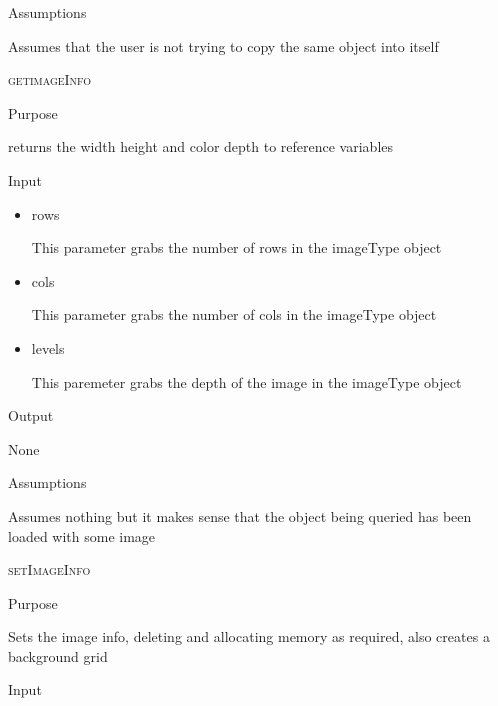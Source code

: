 \documentclass[pdftex, 11pt]{article}
\begin{document}
\begin{description}
\begin{description}
			\item{Assumptions}

				Assumes that the user is not trying to copy the same
				object into itself


		\end{description}


	\item{\textsc{getimageInfo}}
		\begin{description}
			\item{Purpose}
			
 				returns the width height and color depth 
				to reference variables

			\item{Input}

				\begin{itemize}
					\item{rows}

						This parameter grabs the number of rows
						in the imageType object

					\item{cols}

						This parameter grabs the number of cols
						in the imageType object

					\item{levels}

						This paremeter grabs the depth of the
						image in the imageType object

				\end{itemize}

			\item{Output}

				None

			\item{Assumptions}

				Assumes nothing but it makes sense that the object being
				queried has been loaded with some image



		\end{description}


	\item{\textsc{setImageInfo}}
		\begin{description}
			\item{Purpose}
			
				Sets the image info, deleting and allocating memory
				as required, also creates a background grid

			\item{Input}


\end{description}
\end{description}
\end{document}
